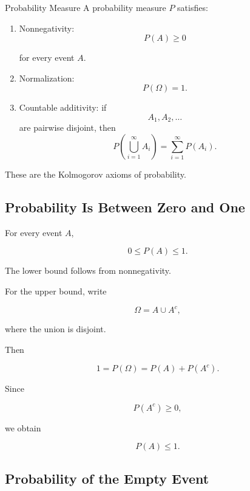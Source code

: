 \begin{definitionbox}{Probability Measure}
A probability measure \(P\) satisfies:

\begin{enumerate}
    \item Nonnegativity:
    \[
    \boxed{
    P(A)\geq0
    }
    \]

    for every event \(A\).

    \item Normalization:
    \[
    \boxed{
    P(\Omega)=1.
    }
    \]

    \item Countable additivity:
    if
    \[
    A_1,A_2,\ldots
    \]
    are pairwise disjoint, then
    \[
    \boxed{
    P\left(
    \bigcup_{i=1}^{\infty}A_i
    \right)
    =
    \sum_{i=1}^{\infty}P(A_i).
    }
    \]
\end{enumerate}
\end{definitionbox}

These are the Kolmogorov axioms of probability.

\subsection{Probability Is Between Zero and One}
\label{subsec:probability-range}

For every event \(A\),

\[
\boxed{
0\leq P(A)\leq1.
}
\]

The lower bound follows from nonnegativity.

For the upper bound, write

\[
\Omega=A\cup A^c,
\]

where the union is disjoint.

Then

\[
1
=
P(\Omega)
=
P(A)+P(A^c).
\]

Since

\[
P(A^c)\geq0,
\]

we obtain

\[
P(A)\leq1.
\]

\subsection{Probability of the Empty Event}
\label{subsec:empty-event-probability}

